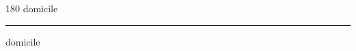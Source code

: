 
\begin{frame}
\begin{center}
\begin{turn}{180}
{\fontsize{2.5cm}{1em}\selectfont domicile}
\end{turn}
\vspace{1em}\par  
\hrule
\vspace{1em}\par  
{\fontsize{2.5cm}{1em}\selectfont domicile}
\end{center}
\end{frame}
